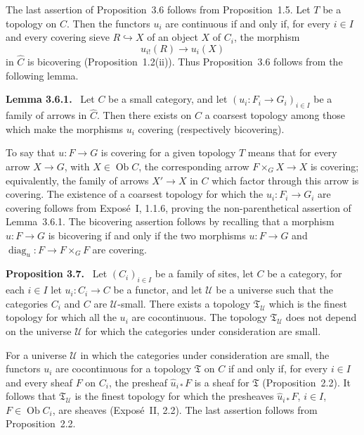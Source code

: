 \documentclass[11pt]{article}
\newcommand{\U}{\mathcal{U}}
\newcommand{\Ob}{\operatorname{Ob}}
\newcommand{\diag}{\operatorname{diag}}
\newenvironment{statement}[1]{\par\medskip\noindent\textbf{#1.}\ }{\par\medskip}
\begin{document}
The last assertion of Proposition~3.6 follows from Proposition~1.5. Let \(T\) be a topology on \(C\). Then the functors \(u_i\) are continuous if and only if, for every \(i\in I\) and every covering sieve \(R\hookrightarrow X\) of an object \(X\) of \(C_i\), the morphism
\[
u_{i!}(R)\longrightarrow u_i(X)
\]
in \(\widehat C\) is bicovering (Proposition~1.2(ii)). Thus Proposition~3.6 follows from the following lemma.

\begin{statement}{Lemma 3.6.1}
Let \(C\) be a small category, and let \((u_i:F_i\to G_i)_{i\in I}\) be a family of arrows in \(\widehat C\). Then there exists on \(C\) a coarsest topology among those which make the morphisms \(u_i\) covering (respectively bicovering).
\end{statement}

To say that \(u:F\to G\) is covering for a given topology \(T\) means that for every arrow \(X\to G\), with \(X\in\Ob C\), the corresponding arrow \(F\times_GX\to X\) is covering; equivalently, the family of arrows \(X'\to X\) in \(C\) which factor through this arrow is covering. The existence of a coarsest topology for which the \(u_i:F_i\to G_i\) are covering follows from Expos\'e~I, 1.1.6, proving the non-parenthetical assertion of Lemma~3.6.1. The bicovering assertion follows by recalling that a morphism \(u:F\to G\) is bicovering if and only if the two morphisms \(u:F\to G\) and \(\diag_u:F\to F\times_G F\) are covering.

\begin{statement}{Proposition 3.7}
Let \((C_i)_{i\in I}\) be a family of sites, let \(C\) be a category, for each \(i\in I\) let \(u_i:C_i\to C\) be a functor, and let \(\U\) be a universe such that the categories \(C_i\) and \(C\) are \(\U\)-small. There exists a topology \(\mathfrak T_\U\) which is the finest topology for which all the \(u_i\) are cocontinuous. The topology \(\mathfrak T_\U\) does not depend on the universe \(\U\) for which the categories under consideration are small.
\end{statement}

For a universe \(\U\) in which the categories under consideration are small, the functors \(u_i\) are cocontinuous for a topology \(\mathfrak T\) on \(C\) if and only if, for every \(i\in I\) and every sheaf \(F\) on \(C_i\), the presheaf \(\widehat u_{i*}F\) is a sheaf for \(\mathfrak T\) (Proposition~2.2). It follows that \(\mathfrak T_\U\) is the finest topology for which the presheaves \(\widehat u_{i*}F\), \(i\in I\), \(F\in\Ob C_i\), are sheaves (Expos\'e~II, 2.2). The last assertion follows from Proposition~2.2.
\end{document}
